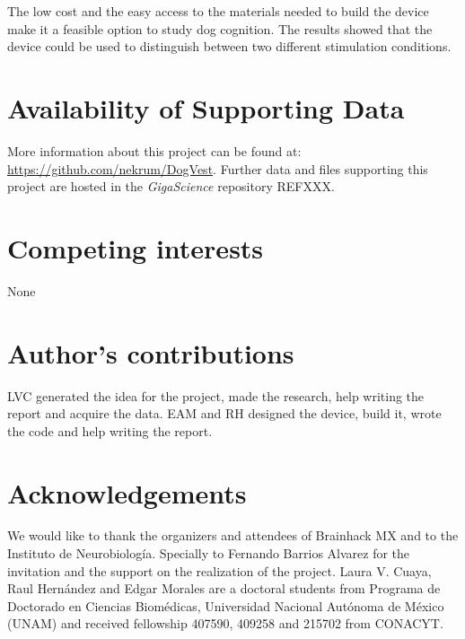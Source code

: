 \documentclass[twocolumn]{bmcart}%
\begin{document}
The low cost and the easy access to the materials needed to build the
device make it a feasible option to study dog cognition. The results
showed that the device could be used to distinguish between two
different stimulation conditions.


\begin{backmatter}

\section*{Availability of Supporting Data}
More information about this project can be found at: \url{https://github.com/nekrum/DogVest}. Further data and files supporting this project are hosted in the \emph{GigaScience} repository REFXXX.

\section*{Competing interests}
None

\section*{Author's contributions}
LVC generated the idea for the project, made the research, help writing
the report and acquire the data. EAM and RH designed the device, build
it, wrote the code and help writing the report.

\section*{Acknowledgements}
We would like to thank the organizers and attendees of Brainhack MX and
to the Instituto de Neurobiología. Specially to Fernando Barrios Alvarez
for the invitation and the support on the realization of the project.
Laura V. Cuaya, Raul Hernández and Edgar Morales are a doctoral students
from Programa de Doctorado en Ciencias Biomédicas, Universidad Nacional
Autónoma de México (UNAM) and received fellowship 407590, 409258 and
215702 from CONACYT.




\end{backmatter}
\end{document}
